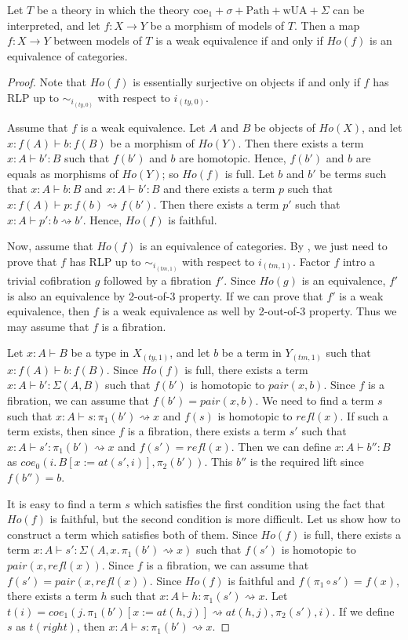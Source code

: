 \documentclass{mscs}
\newcommand{\repl}{:=}
\newcommand{\idtype}{\rightsquigarrow}
\newcommand{\wUA}{\mathrm{wUA}}
\newcommand{\coe}{\mathrm{coe}}
\newcommand{\Path}{\mathrm{Path}}
\numberwithin{figure}{section}
\begin{document}
\begin{prop}[sigma-we-ho]
Let $T$ be a theory in which the theory $\coe_1 + \sigma + \Path + \wUA + \Sigma$ can be interpreted, and let $f : X \to Y$ be a morphism of models of $T$.
Then a map $f : X \to Y$ between models of $T$ is a weak equivalence if and only if $Ho(f)$ is an equivalence of categories.
\end{prop}
\begin{proof}
Note that $Ho(f)$ is essentially surjective on objects if and only if $f$ has RLP up to $\sim_{i_{(ty,0)}}$ with respect to $i_{(ty,0)}$.

Assume that $f$ is a weak equivalence.
Let $A$ and $B$ be objects of $Ho(X)$, and let $x : f(A) \vdash b : f(B)$ be a morphism of $Ho(Y)$.
Then there exists a term $x : A \vdash b' : B$ such that $f(b')$ and $b$ are homotopic.
Hence, $f(b')$ and $b$ are equals as morphisms of $Ho(Y)$; so $Ho(f)$ is full.
Let $b$ and $b'$ be terms such that $x : A \vdash b : B$ and $x : A \vdash b' : B$ and there exists a term $p$ such that $x : f(A) \vdash p : f(b) \idtype f(b')$.
Then there exists a term $p'$ such that $x : A \vdash p' : b \idtype b'$.
Hence, $Ho(f)$ is faithful.

Now, assume that $Ho(f)$ is an equivalence of categories.
By , we just need to prove that $f$ has RLP up to $\sim_{i_{(tm,1)}}$ with respect to $i_{(tm,1)}$.
Factor $f$ intro a trivial cofibration $g$ followed by a fibration $f'$.
Since $Ho(g)$ is an equivalence, $f'$ is also an equivalence by 2-out-of-3 property.
If we can prove that $f'$ is a weak equivalence, then $f$ is a weak equivalence as well by 2-out-of-3 property.
Thus we may assume that $f$ is a fibration.

Let $x : A \vdash B$ be a type in $X_{(ty,1)}$, and let $b$ be a term in $Y_{(tm,1)}$ such that $x : f(A) \vdash b : f(B)$.
Since $Ho(f)$ is full, there exists a term $x : A \vdash b' : \Sigma(A,B)$ such that $f(b')$ is homotopic to $pair(x,b)$.
Since $f$ is a fibration, we can assume that $f(b') = pair(x,b)$.
We need to find a term $s$ such that $x : A \vdash s : \pi_1(b') \idtype x$ and $f(s)$ is homotopic to $refl(x)$.
If such a term exists, then since $f$ is a fibration, there exists a term $s'$ such that $x : A \vdash s' : \pi_1(b') \idtype x$ and $f(s') = refl(x)$.
Then we can define $x : A \vdash b'' : B$ as $coe_0(i.\,B[x \repl at(s',i)], \pi_2(b'))$.
This $b''$ is the required lift since $f(b'') = b$.

It is easy to find a term $s$ which satisfies the first condition using the fact that $Ho(f)$ is faithful, but the second condition is more difficult.
Let us show how to construct a term which satisfies both of them.
Since $Ho(f)$ is full, there exists a term $x : A \vdash s' : \Sigma(A, x.\,\pi_1(b') \idtype x)$ such that $f(s')$ is homotopic to $pair(x, refl(x))$.
Since $f$ is a fibration, we can assume that $f(s') = pair(x, refl(x))$.
Since $Ho(f)$ is faithful and $f(\pi_1 \circ s') = f(x)$, there exists a term $h$ such that $x : A \vdash h : \pi_1(s') \idtype x$.
Let $t(i) = coe_1(j.\,\pi_1(b')[x \repl at(h,j)] \idtype at(h,j), \pi_2(s'), i)$.
If we define $s$ as $t(right)$, then $x : A \vdash s : \pi_1(b') \idtype x$.


\end{proof}
\end{document}
